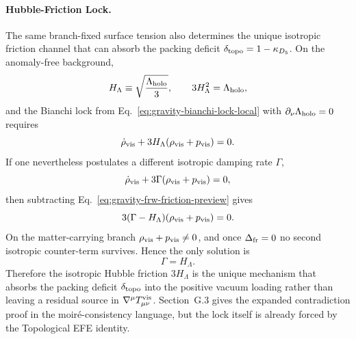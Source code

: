 \documentclass[11pt]{article}
\begin{document}
\paragraph{Hubble-Friction Lock.}
The same branch-fixed surface tension also determines the unique isotropic
friction channel that can absorb the packing deficit
$\delta_{\rm topo}=1-\kappa_{D_5}$. On the anomaly-free background,
\begin{equation}
\label{eq:gravity-hubble-lock-preview}
 H_{\Lambda}
 \equiv
 \sqrt{\frac{\Lambda_{\rm holo}}{3}},
 \qquad
 3H_{\Lambda}^2=\Lambda_{\rm holo},
\end{equation}
and the Bianchi lock from Eq.~\eqref{eq:gravity-bianchi-lock-local} with
$\partial_{\nu}\Lambda_{\rm holo}=0$ requires
\begin{equation}
\label{eq:gravity-frw-friction-preview}
 \dot\rho_{\rm vis}+3H_{\Lambda}(\rho_{\rm vis}+p_{\rm vis})=0.
\end{equation}
If one nevertheless postulates a different isotropic damping rate $\Gamma$,
\begin{equation}
\label{eq:gravity-general-friction-preview}
 \dot\rho_{\rm vis}+3\Gamma(\rho_{\rm vis}+p_{\rm vis})=0,
\end{equation}
then subtracting Eq.~\eqref{eq:gravity-frw-friction-preview} gives
\begin{equation}
\label{eq:gravity-friction-uniqueness-preview}
 3(\Gamma-H_{\Lambda})(\rho_{\rm vis}+p_{\rm vis})=0.
\end{equation}
On the matter-carrying branch $\rho_{\rm vis}+p_{\rm vis}\neq0$, and once
$\Delta_{\rm fr}=0$ no second isotropic counter-term survives. Hence the only
solution is
\begin{equation}
\label{eq:gravity-friction-solution-preview}
 \Gamma=H_{\Lambda}.
\end{equation}
Therefore the isotropic Hubble friction $3H_{\Lambda}$ is the unique mechanism
that absorbs the packing deficit $\delta_{\rm topo}$ into the positive vacuum
loading rather than leaving a residual source in $\nabla^{\mu}T^{\rm vis}_{\mu\nu}$.
Section~G.3 gives the expanded contradiction proof in the moir\'e-consistency
language, but the lock itself is already forced by the Topological EFE identity.
\end{document}
